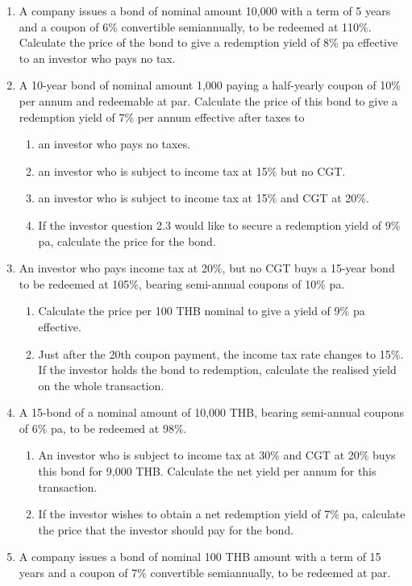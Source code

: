 \documentclass[
]{article}
\theoremstyle{definition}
\theoremstyle{definition}
\theoremstyle{definition}
\theoremstyle{definition}
\theoremstyle{remark}
\begin{document}
\begin{enumerate}
\def\labelenumi{\arabic{enumi}.}
\item
  A company issues a bond of nominal amount 10,000 with a term of 5
  years and a coupon of 6\% convertible semiannually, to be redeemed at
  110\%. Calculate the price of the bond to give a redemption yield of
  8\% pa effective to an investor who pays no tax.
\item
  A 10-year bond of nominal amount 1,000 paying a half-yearly coupon of
  10\% per annum and redeemable at par. Calculate the price of this
  bond to give a redemption yield of 7\% per annum effective after
  taxes to

  \begin{enumerate}
  \def\labelenumii{\arabic{enumii}.}
  \item
    an investor who pays no taxes.
  \item
    an investor who is subject to income tax at 15\% but no CGT.
  \item
    an investor who is subject to
    income tax at 15\% and CGT at 20\%.
  \item
    If the investor question 2.3 would like to secure a redemption yield of 9\%
    pa, calculate the price for the bond.
  \end{enumerate}
\item
  An investor who pays income tax at 20\%, but no CGT buys a 15-year
  bond to be redeemed at 105\%, bearing semi-annual coupons of 10\% pa.

  \begin{enumerate}
  \def\labelenumii{\arabic{enumii}.}
  \item
    Calculate the price per 100 THB nominal to give a yield of 9\% pa
    effective.
  \item
    Just after the 20th coupon payment, the income tax rate changes
    to 15\%. If the investor holds the bond to redemption, calculate
    the realised yield on the whole transaction.
  \end{enumerate}
\item
  A 15-bond of a nominal amount of 10,000 THB, bearing semi-annual coupons
  of 6\% pa, to be redeemed at 98\%.

  \begin{enumerate}
  \def\labelenumii{\arabic{enumii}.}
  \item
    An investor who is subject to income tax at 30\% and CGT at 20\%
    buys this bond for 9,000 THB. Calculate the net yield per annum for
    this transaction.
  \item
    If the investor wishes to obtain a net redemption yield of 7\%
    pa, calculate the price that the investor should pay for the
    bond.
  \end{enumerate}
\item
  A company issues a bond of nominal 100 THB amount with a term of 15 years
  and a coupon of 7\% convertible semiannually, to be redeemed at par.


\end{enumerate}
\end{document}
